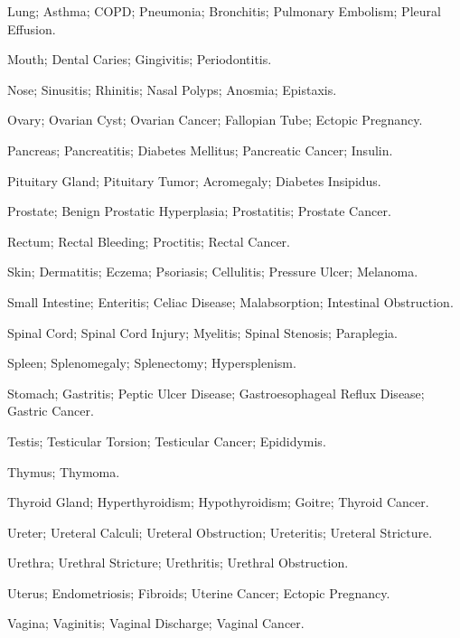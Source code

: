 \begin{description}[style=nextline,leftmargin=0pt,labelwidth=0pt,labelindent=0pt]
\item[Lung]
Lung; Asthma; COPD; Pneumonia; Bronchitis; Pulmonary Embolism; Pleural Effusion.

\item[Mouth]
Mouth; Dental Caries; Gingivitis; Periodontitis.

\item[Nose]
Nose; Sinusitis; Rhinitis; Nasal Polyps; Anosmia; Epistaxis.

\item[Ovary]
Ovary; Ovarian Cyst; Ovarian Cancer; Fallopian Tube; Ectopic Pregnancy.

\item[Pancreas]
Pancreas; Pancreatitis; Diabetes Mellitus; Pancreatic Cancer; Insulin.

\item[Pituitary Gland]
Pituitary Gland; Pituitary Tumor; Acromegaly; Diabetes Insipidus.

\item[Prostate]
Prostate; Benign Prostatic Hyperplasia; Prostatitis; Prostate Cancer.

\item[Rectum]
Rectum; Rectal Bleeding; Proctitis; Rectal Cancer.

\item[Skin]
Skin; Dermatitis; Eczema; Psoriasis; Cellulitis; Pressure Ulcer; Melanoma.

\item[Small Intestine]
Small Intestine; Enteritis; Celiac Disease; Malabsorption; Intestinal Obstruction.

\item[Spinal Cord]
Spinal Cord; Spinal Cord Injury; Myelitis; Spinal Stenosis; Paraplegia.

\item[Spleen]
Spleen; Splenomegaly; Splenectomy; Hypersplenism.

\item[Stomach]
Stomach; Gastritis; Peptic Ulcer Disease; Gastroesophageal Reflux Disease; Gastric Cancer.

\item[Testis]
Testis; Testicular Torsion; Testicular Cancer; Epididymis.

\item[Thymus]
Thymus; Thymoma.

\item[Thyroid Gland]
Thyroid Gland; Hyperthyroidism; Hypothyroidism; Goitre; Thyroid Cancer.

\item[Ureter]
Ureter; Ureteral Calculi; Ureteral Obstruction; Ureteritis; Ureteral Stricture.

\item[Urethra]
Urethra; Urethral Stricture; Urethritis; Urethral Obstruction.

\item[Uterus]
Uterus; Endometriosis; Fibroids; Uterine Cancer; Ectopic Pregnancy.

\item[Vagina]
Vagina; Vaginitis; Vaginal Discharge; Vaginal Cancer.
\end{description}
